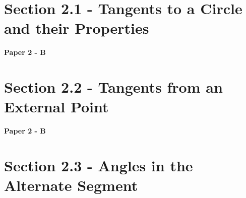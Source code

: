 \documentclass[12pt, a4paper]{article}
\begin{document}
\section*{Section 2.1 - Tangents to a Circle and their Properties \NF}\label{section:5-2-1}

\textbf{Paper 2 - B}
\begin{enumx}[label=\arabic*.,start=1]
\item {}\label{DSE2012S-CoreP2-Q41} 
\item {}\label{DSE2012-CoreP2-Q41} 
\item {}\label{DSE2013-CoreP2-Q41} 
\item {}\label{DSE2014-CoreP2-Q41} 
\item {}\label{DSE2019-CoreP2-Q39} 
\end{enumx}




\section*{Section 2.2 - Tangents from an External Point \NF}\label{section:5-2-2}

\textbf{Paper 2 - B}
\begin{enumx}[label=\arabic*.,start=6]
\item {}\label{DSE2015-CoreP2-Q40} 
\item {}\label{DSE2016-CoreP2-Q40} 
\end{enumx}




\section*{Section 2.3 - Angles in the Alternate Segment \NF}\label{section:5-2-3}
\end{document}
